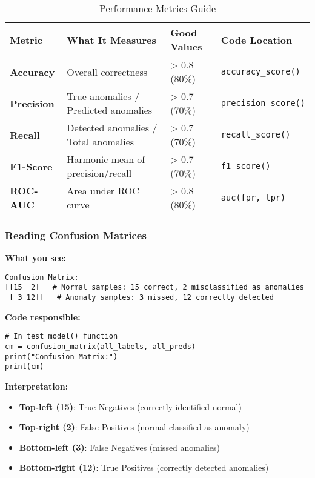 \documentclass[12pt,a4paper]{article}
\begin{document}
\begin{table}[H]
\centering
\begin{tabular}{|l|p{4cm}|p{4cm}|p{3cm}|}
\hline
\textbf{Metric} & \textbf{What It Measures} & \textbf{Good Values} & \textbf{Code Location} \\
\hline
\textbf{Accuracy} & Overall correctness & > 0.8 (80\%) & \texttt{accuracy\_score()} \\
\hline
\textbf{Precision} & True anomalies / Predicted anomalies & > 0.7 (70\%) & \texttt{precision\_score()} \\
\hline
\textbf{Recall} & Detected anomalies / Total anomalies & > 0.7 (70\%) & \texttt{recall\_score()} \\
\hline
\textbf{F1-Score} & Harmonic mean of precision/recall & > 0.7 (70\%) & \texttt{f1\_score()} \\
\hline
\textbf{ROC-AUC} & Area under ROC curve & > 0.8 (80\%) & \texttt{auc(fpr, tpr)} \\
\hline
\end{tabular}
\caption{Performance Metrics Guide}
\end{table}

\subsubsection{Reading Confusion Matrices}

\textbf{What you see:}
\begin{lstlisting}
Confusion Matrix:
[[15  2]   # Normal samples: 15 correct, 2 misclassified as anomalies
 [ 3 12]]   # Anomaly samples: 3 missed, 12 correctly detected
\end{lstlisting}

\textbf{Code responsible:}
\begin{lstlisting}
# In test_model() function
cm = confusion_matrix(all_labels, all_preds)
print("Confusion Matrix:")
print(cm)
\end{lstlisting}

\textbf{Interpretation:}
\begin{itemize}
    \item \textbf{Top-left (15)}: True Negatives (correctly identified normal)
    \item \textbf{Top-right (2)}: False Positives (normal classified as anomaly)
    \item \textbf{Bottom-left (3)}: False Negatives (missed anomalies)
    \item \textbf{Bottom-right (12)}: True Positives (correctly detected anomalies)
\end{itemize}
\end{document}
